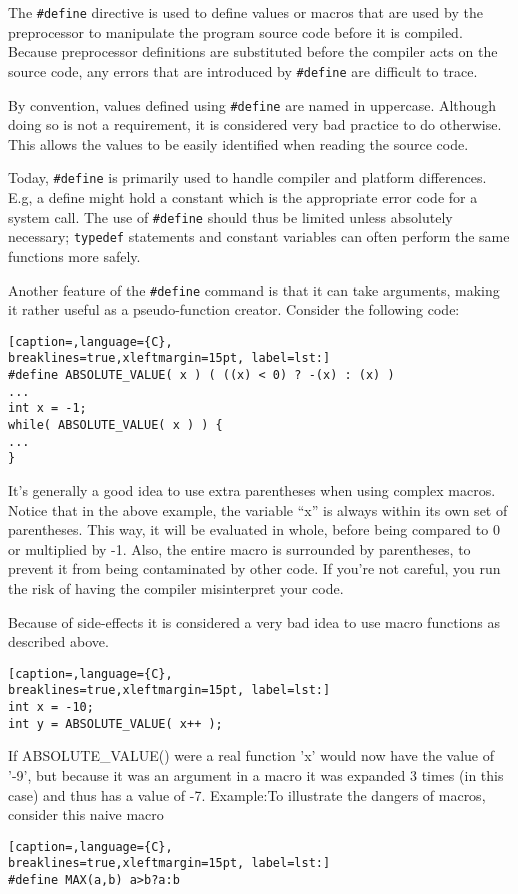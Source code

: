 The \texttt{\#define} directive is used to define values or macros that are
used by the preprocessor to manipulate the program source code before it is
compiled. Because preprocessor definitions are substituted before the compiler
acts on the source code, any errors that are introduced by \texttt{\#define}
are difficult to trace. 

By convention, values defined using \texttt{\#define} are named in uppercase.
Although doing so is not a requirement, it is considered very bad practice to
do otherwise. This allows the values to be easily identified when reading the
source code.

Today, \texttt{\#define} is primarily used to handle compiler and platform
differences. E.g, a define might hold a constant which is the appropriate error
code for a system call. The use of \texttt{\#define} should thus be limited
unless absolutely necessary; \texttt{typedef} statements and constant variables
can often perform the same functions more safely. 

Another feature of the \texttt{\#define} command is that it can take arguments,
making it rather useful as a pseudo-function creator. Consider the following
code: 
\lstset{basicstyle=\scriptsize, numbers=left, captionpos=b, tabsize=4}
\begin{lstlisting}[caption=,language={C},
breaklines=true,xleftmargin=15pt, label=lst:]
#define ABSOLUTE_VALUE( x ) ( ((x) < 0) ? -(x) : (x) )
...
int x = -1;
while( ABSOLUTE_VALUE( x ) ) {
...
}
\end{lstlisting}
		
It's generally a good idea to use extra parentheses when using complex macros.
Notice that in the above example, the variable ``x'' is always within its own
set of parentheses. This way, it will be evaluated in whole, before being
compared to 0 or multiplied by -1. Also, the entire macro is surrounded by
parentheses, to prevent it from being contaminated by other code. If you're not
careful, you run the risk of having the compiler misinterpret your code.

Because of side-effects it is considered a very bad idea to use macro functions
as described above.
\lstset{basicstyle=\scriptsize, numbers=left, captionpos=b, tabsize=4}
\begin{lstlisting}[caption=,language={C},
breaklines=true,xleftmargin=15pt, label=lst:]
int x = -10;
int y = ABSOLUTE_VALUE( x++ );
\end{lstlisting}

If ABSOLUTE\_VALUE() were a real function 'x' would now have the value of '-9',
but because it was an argument in a macro it was expanded 3 times (in this
case) and thus has a value of -7.
Example:To illustrate the dangers of macros, consider this naive macro
\lstset{basicstyle=\scriptsize, numbers=left, captionpos=b, tabsize=4}
\begin{lstlisting}[caption=,language={C},
breaklines=true,xleftmargin=15pt, label=lst:]
#define MAX(a,b) a>b?a:b
\end{lstlisting}

